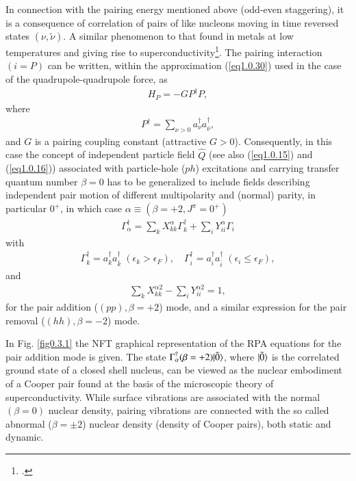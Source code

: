 In connection with the pairing energy mentioned above (odd-even staggering),  it is a consequence of correlation of pairs of like nucleons moving in  time reversed states $(\nu,\tilde \nu)$. A similar phenomenon to that found in metals at low temperatures and giving rise to superconductivity\footnote{\cite{Bohr:58}.}. The pairing interaction $(i=P)$ can be written, within the approximation (\ref{eq1.0.30}) used in the case of the quadrupole-quadrupole force, as 
\begin{align}\label{eq1.0.32}
H_P=- GP^\dagger P,
\end{align}
where 
\begin{align}\label{eq1.0.33}
 P^\dagger=\sum_{\nu>0}a^\dagger_\nu a^\dagger_{\bar\nu},
\end{align}
and $G$ is a pairing coupling constant (attractive $G>0$).
Consequently, in this case the concept of independent particle field $\hat Q$ (see also (\ref{eq1.0.15}) and (\ref{eq1.0.16})) associated with particle-hole ($ph$) excitations and carrying transfer quantum number $\beta=0$ has to be generalized to include fields describing independent pair motion of different multipolarity and (normal) parity, in particular $0^+$, in which case $\alpha\equiv(\beta=+2,J^\pi=0^+)$
\begin{align}\label{eq1.0.34}
\Gamma^\dagger_\alpha=\sum_kX^\alpha_{kk}\Gamma_k^\dagger+\sum_iY^\alpha_{ii}\Gamma_i
\end{align}
with 
\begin{align}\label{eq1.0.35}
\Gamma^\dagger_k=a^\dagger_ka^\dagger_{\bar k}\;(\epsilon_k>\epsilon_F),\quad \Gamma^\dagger_i=a^\dagger_ia^\dagger_{\bar i}\;(\epsilon_i\leq\epsilon_F),
\end{align}
and
\begin{align}\label{eq1.0.36}
\sum_kX_{kk}^{\alpha 2}-\sum_i Y_{ii}^{\alpha 2}=1,
\end{align}
for the pair addition ($(pp),\beta=+2$) mode, and a similar expression for the pair removal ($(hh),\beta=-2$) mode.

 In Fig. \ref{fig0.3.1} the NFT graphical representation of the RPA equations for the pair addition mode is given. The state $\Gamma^\dagger_\alpha(\beta=+2)|{\tilde 0} \rangle$, where $|{\tilde 0} \rangle$ is the correlated ground state of a closed shell nucleus, can be viewed as the nuclear embodiment of a Cooper pair found at the basis of the microscopic theory of superconductivity.
While surface vibrations are associated with the normal $(\beta=0)$ nuclear density, pairing vibrations are connected with the so called abnormal ($\beta=\pm2$) nuclear density (density of Cooper pairs), both static and dynamic.

